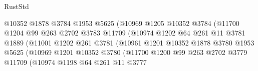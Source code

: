 \begin{lexlean}{RustStd}
\begin{coremodule}
                                      @10352
                                      @1878
                                      @3784
                                      @1953
                                      @5625
                                      (@10969
                                        @1205
                                        @10352
                                        @3784
                                        (@11700
                                          @1204
                                          @99
                                          @263
                                          @2702
                                          @3783
                                          @11709
                                          (@10974
                                            @1202
                                            @64
                                            @261
                                            @11
                                            @3781
                                            @1889
                                            (@11001
                                              @1202
                                              @261
                                              @3781
                                              (@10961
                                                @1201
                                                @10352
                                                @1878
                                                @3780
                                                @1953
                                                @5625
                                                (@10969
                                                  @1201
                                                  @10352
                                                  @3780
                                                  (@11700
                                                    @1200
                                                    @99
                                                    @263
                                                    @2702
                                                    @3779
                                                    @11709
                                                    (@10974
                                                      @1198
                                                      @64
                                                      @261
                                                      @11
                                                      @3777

\end{coremodule}
\end{lexlean}
